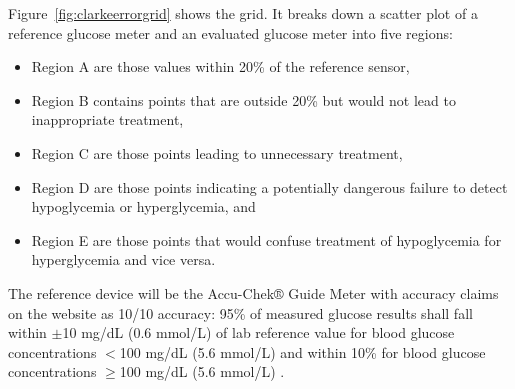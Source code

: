 Figure~\ref{fig:clarkeerrorgrid} shows the grid. It breaks down a scatter plot of a reference glucose meter and an evaluated glucose meter into five regions:

\begin{itemize}
    \item Region A are those values within 20\% of the reference sensor,
    \item Region B contains points that are outside 20\% but would not lead to inappropriate treatment,
    \item Region C are those points leading to unnecessary treatment,
    \item Region D are those points indicating a potentially dangerous failure to detect hypoglycemia or hyperglycemia, and
    \item Region E are those points that would confuse treatment of hypoglycemia for hyperglycemia and vice versa.
\end{itemize}


The reference device will be the Accu-Chek® Guide Meter with accuracy claims on the website as 10/10 accuracy: 95\% of measured glucose results shall fall within $\pm$10 mg/dL (0.6 mmol/L) of lab reference value for blood glucose concentrations $<$100 mg/dL (5.6 mmol/L) and within 10\% for blood glucose concentrations $\geq$100 mg/dL (5.6 mmol/L) \citep{accu2022}.





